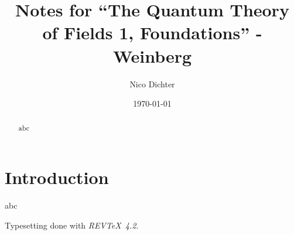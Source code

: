 \documentclass[%
reprint,
amsmath,amssymb,
aps,
pra,
floatfix,
]{revtex4-2}
\begin{document}
	\title{Notes for \enquote{The Quantum Theory of Fields 1, Foundations} - Weinberg}
	
	\author{Nico Dichter}
	
	
	\date{\today}
	
	\begin{abstract}
		abc
	\end{abstract}
	
	\maketitle
	
	\section{Introduction}\label{sec:introduction}
	abc
	
	
	
	
	
	\begin{acknowledgments}
		Typesetting done with \emph{REV\TeX\ 4.2}.
	\end{acknowledgments}
	
	
	
	
	
	
	
\end{document}
